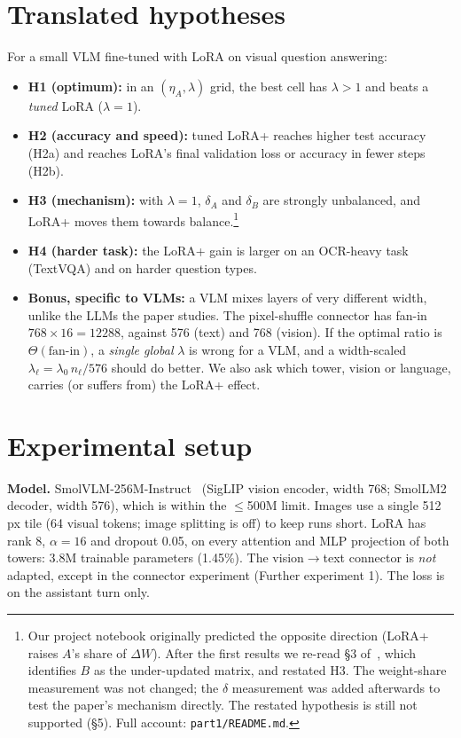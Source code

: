 \documentclass[10pt,a4paper]{article}
\newcommand{\etaA}{\eta_A}
\begin{document}
\section{Translated hypotheses}
For a small VLM fine-tuned with LoRA on visual question answering:
\begin{itemize}
  \item \textbf{H1 (optimum):} in an $(\etaA, \lambda)$ grid, the best cell has $\lambda > 1$ and beats a
        \emph{tuned} LoRA ($\lambda = 1$).
  \item \textbf{H2 (accuracy and speed):} tuned LoRA+ reaches higher test accuracy (H2a) and reaches LoRA's final
        validation loss or accuracy in fewer steps (H2b).
  \item \textbf{H3 (mechanism):} with $\lambda = 1$, $\delta_A$ and $\delta_B$ are strongly unbalanced, and LoRA+
        moves them towards balance.\footnote{Our project notebook originally predicted the opposite direction
        (LoRA+ raises $A$'s share of $\Delta W$). After the first results we re-read \S3 of~\cite{loraplus}, which
        identifies $B$ as the under-updated matrix, and restated H3. The weight-share measurement was not changed;
        the $\delta$ measurement was added afterwards to test the paper's mechanism directly. The restated
        hypothesis is still not supported (\S5). Full account: \texttt{part1/README.md}.}
  \item \textbf{H4 (harder task):} the LoRA+ gain is larger on an OCR-heavy task (TextVQA) and on harder question
        types.
  \item \textbf{Bonus, specific to VLMs:} a VLM mixes layers of very different width, unlike the LLMs the paper
        studies. The pixel-shuffle connector has fan-in $768\times16 = 12288$, against 576 (text) and 768 (vision).
        If the optimal ratio is $\Theta(\text{fan-in})$, a \emph{single global} $\lambda$ is wrong for a VLM, and
        a width-scaled $\lambda_\ell = \lambda_0\,n_\ell/576$ should do better. We also ask which tower,
        vision or language, carries (or suffers from) the LoRA+ effect.
\end{itemize}

\section{Experimental setup}
\textbf{Model.} SmolVLM-256M-Instruct~\cite{smolvlm} (SigLIP vision encoder, width 768; SmolLM2 decoder, width 576),
which is within the $\le$500M limit. Images use a single 512\,px tile (64 visual tokens; image splitting is off) to
keep runs short. LoRA has rank 8, $\alpha = 16$ and dropout 0.05, on every attention and MLP projection of both
towers: 3.8M trainable parameters (1.45\%). The vision$\to$text connector is \emph{not} adapted, except in the
connector experiment (Further experiment 1). The loss is on the assistant turn only.
\end{document}
